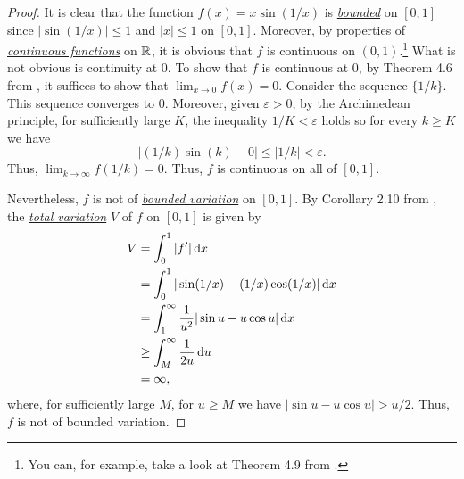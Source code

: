 \begin{proof}
  It is clear that the function $f(x)=x\sin(1/x)$ is
  \href{https://en.wikipedia.org/wiki/Bounded_function}{\emph{bounded}} on
  $[0,1]$ since $|{\sin(1/x)}|\leq 1$ and $|x|\leq 1$ on $[0,1]$. Moreover,
  by properties of
  \href{https://en.wikipedia.org/wiki/Continuous_function#Weierstrass_definition_.28epsilon.E2.80.93delta.29_of_continuous_functions}{\emph{continuous
      functions}} on $\mathbb{R}$, it is obvious that $f$ is continuous on
  $(0,1)$.\footnote{You can, for example, take a look at Theorem 4.9 from
    \cite[Ch.\@ 4, p.\@ 87]{rudin-1}.} What is not obvious is continuity at
  $0$. To show that $f$ is continuous at $0$, by Theorem 4.6 from
  \cite[Ch.\@ 4, p.\@ 86]{rudin-1}, it suffices to show that
  $\lim_{x\to 0}f(x)=0$. Consider the sequence $\{1/k\}$. This sequence
  converges to $0$. Moreover, given $\varepsilon>0$, by the Archimedean
  principle, for sufficiently large $K$, the inequality $1/K<\varepsilon$
  holds so for every $k\geq K$ we have
\begin{equation}
\label{eq:1:1}
\left|(1/k)\sin(k)-0\right|\leq
\left|1/k\right|<\varepsilon.
\end{equation}
Thus, $\lim_{k\to\infty}f(1/k)=0$. Thus, $f$ is continuous on all of
$[0,1]$.

Nevertheless, $f$ is not of
\href{https://en.wikipedia.org/wiki/Bounded_variation}{\emph{bounded
    variation}} on $[0,1]$. By Corollary 2.10 from \cite[Ch.\@ 2, p.\@
23]{wheeden-zygmund}, the
\href{https://en.wikipedia.org/wiki/Total_variation}{\emph{total
    variation}} $V$ of $f$ on $[0,1]$ is given by
\begin{equation}
\label{eq:sp16:1:2}
\begin{aligned}
V&=\int_0^1|f'|\mathop{}\!\mathrm{d} x\\
&=\int_0^1|\sin(1/x)-(1/x)\cos(1/x)|\mathop{}\!\mathrm{d} x\\
&=\int_1^\infty\frac{1}{u^2}|\sin u-u\cos u|\mathop{}\!\mathrm{d} x\\
&\geq\int_M^\infty \frac{1}{2u}\mathop{}\!\mathrm{d} u\\
&=\infty,
\end{aligned}
\end{equation}
where, for sufficiently large $M$, for $u\geq M$ we have $|{\sin u- u\cos
  u}|>u/2$. Thus, $f$ is not of bounded variation.
\end{proof}


